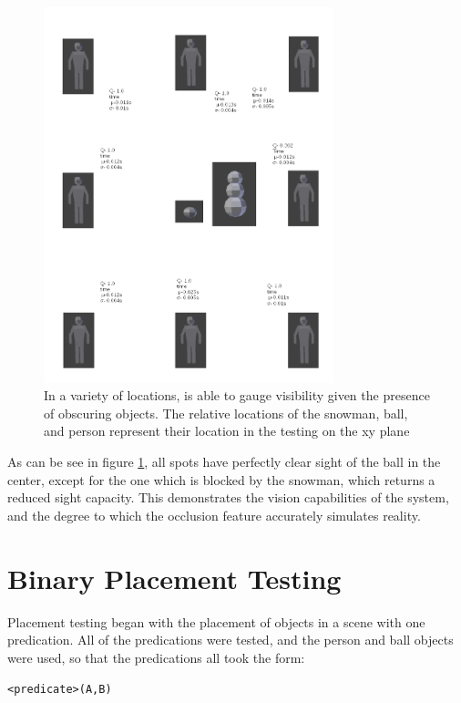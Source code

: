 \begin{figure}[h]
	\begin{center}
		\includegraphics[width=0.75\textwidth]{figures/see_query.png}
	\end{center}
	\caption{In a variety of locations, \TDS is able to gauge visibility given the presence of obscuring objects. The relative locations of the snowman, ball, and person represent their location in the testing on the xy plane}
	\label{fig:see_query}
\end{figure}

As can be see in figure \ref{fig:see_query}, all spots have perfectly clear sight of the ball in the center, except for the one which is blocked by the snowman, which returns a reduced sight capacity. This demonstrates the vision capabilities of the system, and the degree to which the occlusion feature accurately simulates reality.

\section{Binary Placement Testing}

Placement testing began with the placement of objects in a scene with one predication. All of the predications were tested, and the person and ball objects were used, so that the predications all took the form:
\begin{center} \texttt{<predicate>(A,B)}\end{center}

